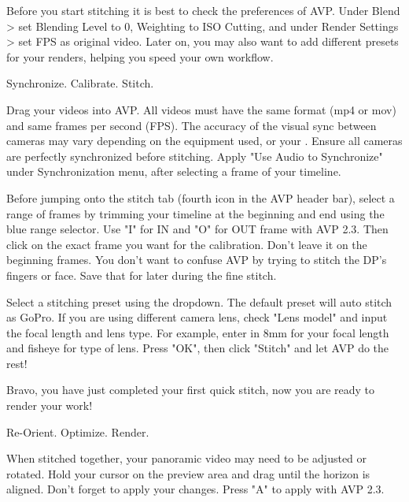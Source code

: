\begin{fullwidth}
\tip Before you start stitching it is best to check the preferences of AVP. Under Blend > set Blending Level to 0, Weighting to ISO Cutting, and under Render Settings > set FPS as original video. Later on, you may also want to add different presets for your renders, helping you speed your own workflow.


{\large Synchronize. Calibrate. Stitch. \par}

Drag your videos into AVP. All videos must have the same format (mp4 or mov) and same frames per second (FPS). The accuracy of the visual sync between cameras may vary depending on the equipment used, or your \textbf{}. Ensure all cameras are perfectly synchronized before stitching. Apply "Use Audio to Synchronize" under Synchronization menu, after selecting a frame of your timeline. 


Before jumping onto the stitch tab (fourth icon in the AVP header bar), select a range of frames by trimming your timeline at the beginning and end using the blue range selector. Use "I" for IN and "O" for OUT frame with AVP 2.3. Then click on the exact frame you want for the calibration. Don't leave it on the beginning frames. You don't want to confuse AVP by trying to stitch the DP's fingers or face. Save that for later during the fine stitch. 


Select a stitching preset using the dropdown. The default preset will auto stitch as GoPro. If you are using different camera lens, check "Lens model" and input the focal length and lens type. For example, enter in 8mm for your focal length and fisheye for type of lens. Press "OK", then click "Stitch" and let AVP do the rest!


Bravo, you have just completed your first quick stitch, now you are ready to render your work!

{\large Re-Orient. Optimize. Render. \par}

When stitched together, your panoramic video may need to be adjusted or rotated. Hold your cursor on the preview area and drag until the horizon is aligned. Don't forget to apply your changes. Press "A" to apply with AVP 2.3.


\end{fullwidth}
